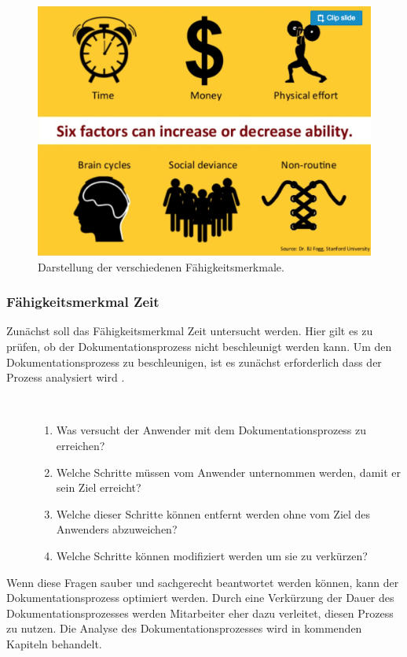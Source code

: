 \documentclass[a4paper,12pt]{scrartcl}
\begin{document}
\begin{figure}[h!]
\begin{center}
\includegraphics[scale = 0.4]{Bilder/Faehigkeitenfaktoren.eps}
\caption{Darstellung der verschiedenen Fähigkeitsmerkmale. \cite{Merkmale2018}}
\label{FähigkeitsmerkmaleBild}
\end{center}
\end{figure}
\subsubsection{Fähigkeitsmerkmal Zeit}
Zunächst soll das Fähigkeitsmerkmal Zeit untersucht werden. Hier gilt es zu prüfen, ob der Dokumentationsprozess nicht beschleunigt werden kann. Um den Dokumentationsprozess zu beschleunigen, ist es zunächst erforderlich dass der Prozess analysiert wird \cite{Hauptly2008}.\\
\begin{description}
   \item[\parbox{\textwidth}{Um den Dokumentationsprozess sachgemäß zu analysieren müssen die Folgenden Fragen beantwortet werden: \normalfont\vspace{0.5ex}}]~\par
   \begin{enumerate}
      \item Was versucht der Anwender mit dem Dokumentationsprozess zu erreichen?
      \item Welche Schritte müssen vom Anwender unternommen werden, damit er sein Ziel erreicht?
      \item Welche dieser Schritte können entfernt werden ohne vom Ziel des Anwenders abzuweichen?
      \item Welche Schritte können modifiziert werden um sie zu verkürzen?
   \end{enumerate}
\end{description}
Wenn diese Fragen sauber und sachgerecht beantwortet werden können, kann der Dokumentationsprozess optimiert werden. Durch eine Verkürzung der Dauer des Dokumentationsprozesses werden Mitarbeiter eher dazu verleitet, diesen Prozess zu nutzen. Die Analyse des Dokumentationsprozesses wird in kommenden Kapiteln behandelt.
\end{document}
